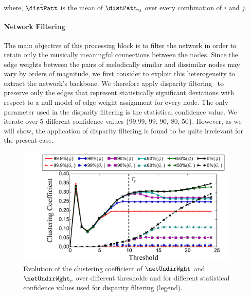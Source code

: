 {\noindent where, $\bar{\distPatt}$ is the mean of $\distPatt_{ij}$ over every combination of $i$ and $j$. 


\paragraph{Network Filtering}
\label{sec:network_filtering}

The main objective of this processing block is to filter the network in order to retain only the musically meaningful connections between the nodes. Since the edge weights between the pairs of melodically similar and dissimilar nodes may vary by orders of magnitude, we first consider to exploit this heterogeneity to extract the network's backbone. We therefore apply disparity filtering~\citep{Serrano09PNAS} to preserve only the edges that represent statistically significant deviations with respect to a null model of edge weight assignment for every node. The only parameter used in the disparity filtering is the statistical confidence value. We iterate over 5 different confidence values $\lbrace$99.99, 99, 90, 80, 50$\rbrace$. However, as we will show, the application of disparity filtering is found to be quite irrelevant for the present case.

\begin{figure}
	\begin{center}
		\includegraphics[width=\figSizeEightyFive]{ch06_patterns/figures/Characterization/CC_Curves_shrunk.pdf}
	\end{center}
	\caption[Evolution of clustering coefficient of a network of melodic patterns]{Evolution of the clustering coefficient of $\netUndirWght$ and $\netUndirWght_r$ over different thresholds and for different statistical confidence values used for disparity filtering (legend).}
	\label{fig:cc_curve_pattern_characterization}
\end{figure}

}
